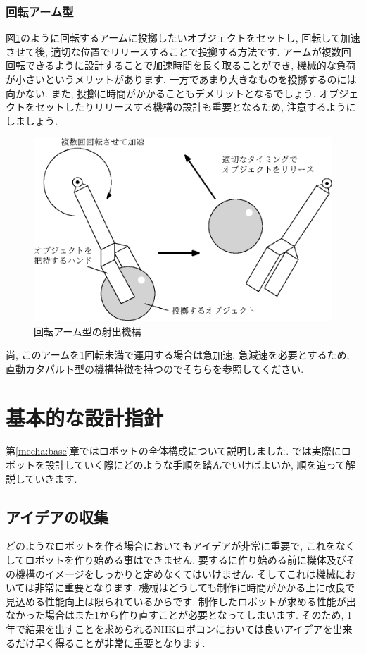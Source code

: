 \subsubsection{回転アーム型}
図\ref{fig:rotate}のように回転するアームに投擲したいオブジェクトをセットし, 回転して加速させて後, 適切な位置でリリースすることで投擲する方法です. アームが複数回回転できるように設計することで加速時間を長く取ることができ, 機械的な負荷が小さいというメリットがあります. 一方であまり大きなものを投擲するのには向かない. また, 投擲に時間がかかることもデメリットとなるでしょう. オブジェクトをセットしたりリリースする機構の設計も重要となるため, 注意するようにしましょう. 

\begin{figure}[h]
  \centering
  \includegraphics[width=12.5cm]{mecha/fig/rotate.eps}
  \caption{回転アーム型の射出機構}
  \label{fig:rotate}
\end{figure}

尚, このアームを1回転未満で運用する場合は急加速, 急減速を必要とするため, 直動カタパルト型の機構特徴を持つのでそちらを参照してください.
\section{基本的な設計指針}
第\ref{mecha:base}章ではロボットの全体構成について説明しました. では実際にロボットを設計していく際にどのような手順を踏んでいけばよいか, 順を追って解説していきます. 
\subsection{アイデアの収集}
どのようなロボットを作る場合においてもアイデアが非常に重要で, これをなくしてロボットを作り始める事はできません. 要するに作り始める前に機体及びその機構のイメージをしっかりと定めなくてはいけません. 
そしてこれは機械においては非常に重要となります. 機械はどうしても制作に時間がかかる上に改良で見込める性能向上は限られているからです. 制作したロボットが求める性能が出なかった場合はまた1から作り直すことが必要となってしまいます. そのため, 1年で結果を出すことを求められるNHKロボコンにおいては良いアイデアを出来るだけ早く得ることが非常に重要となります.


